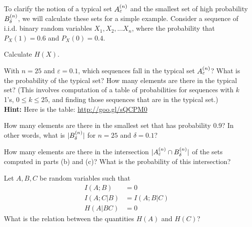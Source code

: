 \documentclass[a4paper,10pt,landscape,twocolumn]{scrartcl}
\begin{document}
\begin{exercise}
To clarify the notion of a typical set $A^{(n)}_{\varepsilon}$ and the smallest set of high probability $B^{(n)}_{\delta}$, we will calculate these sets for a simple example. Consider a sequence of i.i.d. binary random variables $X_1, X_2, . . . X_n$, where the probability that $P_X(1) = 0.6$ and $P_X(0) = 0.4$.
	\begin{subex}[(1pt)]
	Calculate $H(X)$.
	\end{subex}
	\begin{subex}[(3pt)]
	With $n = 25$ and $\varepsilon = 0.1$, which sequences fall in the typical set $A^{(n)}_{\varepsilon}$? What is the probability of the typical set? How many elements are there in the typical set? (This involves computation of a table of probabilities for sequences with $k$ 1's, $0 \leq k \leq 25$, and finding those sequences that are in the typical set.)
\\\textbf{Hint:} Here is the table: \url{http://goo.gl/sQCPM0}
	\end{subex}
	\begin{subex}[(2pt)]
	How many elements are there in the smallest set that has probability 0.9? In other words, what is $|B^{(n)}_{\delta}|$ for $n = 25$ and $\delta = 0.1$?
	\end{subex}
	\begin{subex}[(2pt)]
	How many elements are there in the intersection $|A^{(n)}_{\varepsilon} \cap B^{(n)}_{\delta}|$ of the sets computed in parts (b) and (c)? What is the probability of this intersection?
	\end{subex}
\end{exercise}

\begin{exercise}
Let $A,B,C$ be random variables such that
\begin{align*}
I(A;B) &= 0\\
I(A;C|B) &= I(A;B|C)\\
H(A|BC) &= 0
\end{align*}
What is the relation between the quantities $H(A)$ and $H(C)$?
\end{exercise}
\end{document}
